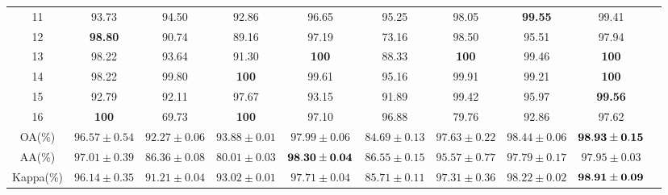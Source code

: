 \documentclass[]{interact}
\theoremstyle{plain}%
\theoremstyle{definition}
\theoremstyle{remark}
\begin{document}
\begin{table}[H]
\begin{center}
{\begin{tabular}{cccccccccc}
                    11            &93.73      &94.50   &92.86     &96.65         &95.25       &98.05                       &{\bf99.55}  &99.41                            \\
                    12            &{\bf98.80}      &90.74   &89.16     &97.19         &73.16       &98.50                       &95.51 &97.94                       \\
                    13            &98.22      &93.64   &91.30     &{\bf100}      &88.33       &{\bf100}                    &99.46  &{\bf100}                      \\
                    14            &98.22      &99.80   &{\bf100}  &99.61         &95.16       &99.91                       &99.21  &{\bf100}                          \\
                    15            &92.79      &92.11   &97.67     &93.15         &91.89       &99.42                      &95.97  &{\bf99.56}                             \\
                    16            &{\bf100}   &69.73   &{\bf100}  &97.10     &96.88       &79.76                       &92.86  &97.62                       \\
        \midrule
                    OA(\%)    &$96.57\pm0.54$ &$92.27\pm0.06$ &$93.88\pm0.01$ &$97.99\pm0.06$  &$84.69\pm0.13$ &$97.63\pm0.22$ &$98.44\pm0.06$     &${\bf98.93\pm0.15}$   \\
                    AA(\%)    &$97.01\pm0.39$ &$86.36\pm0.08$ &$80.01\pm0.03$ &${\bf98.30\pm0.04}$ &$86.55\pm0.15$ &$95.57\pm0.77$  &$97.79\pm0.17$   &$97.95\pm0.03$     \\
                    Kappa(\%) &$96.14\pm0.35$ &$91.21\pm0.04$ &$93.02\pm0.01$ &$97.71\pm0.04$ &$85.71\pm0.11$ &$97.31\pm0.36$  &$98.22\pm0.02$      &${\bf98.91\pm0.09}$   \\
		\bottomrule%
	\end{tabular}}
\end{center} 
\end{table}
\end{document}
